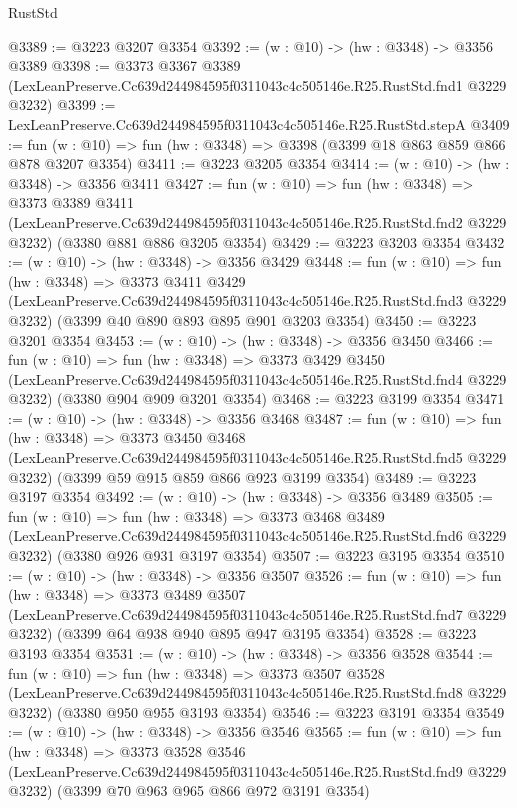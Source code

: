 \begin{lexlean}{RustStd}
\begin{coremodule}
@3389 := @3223 @3207 @3354
@3392 := (w : @10) -> (hw : @3348) -> @3356 @3389
@3398 := @3373
    @3367
    @3389
    (LexLeanPreserve.Cc639d244984595f0311043c4c505146e.R25.RustStd.fnd1 @3229 @3232)
@3399 := LexLeanPreserve.Cc639d244984595f0311043c4c505146e.R25.RustStd.stepA
@3409 := fun (w : @10) => fun (hw : @3348) => @3398 (@3399 @18 @863 @859 @866 @878 @3207 @3354)
@3411 := @3223 @3205 @3354
@3414 := (w : @10) -> (hw : @3348) -> @3356 @3411
@3427 := fun (w : @10) =>
  fun (hw : @3348) =>
  @3373
    @3389
    @3411
    (LexLeanPreserve.Cc639d244984595f0311043c4c505146e.R25.RustStd.fnd2 @3229 @3232)
    (@3380 @881 @886 @3205 @3354)
@3429 := @3223 @3203 @3354
@3432 := (w : @10) -> (hw : @3348) -> @3356 @3429
@3448 := fun (w : @10) =>
  fun (hw : @3348) =>
  @3373
    @3411
    @3429
    (LexLeanPreserve.Cc639d244984595f0311043c4c505146e.R25.RustStd.fnd3 @3229 @3232)
    (@3399 @40 @890 @893 @895 @901 @3203 @3354)
@3450 := @3223 @3201 @3354
@3453 := (w : @10) -> (hw : @3348) -> @3356 @3450
@3466 := fun (w : @10) =>
  fun (hw : @3348) =>
  @3373
    @3429
    @3450
    (LexLeanPreserve.Cc639d244984595f0311043c4c505146e.R25.RustStd.fnd4 @3229 @3232)
    (@3380 @904 @909 @3201 @3354)
@3468 := @3223 @3199 @3354
@3471 := (w : @10) -> (hw : @3348) -> @3356 @3468
@3487 := fun (w : @10) =>
  fun (hw : @3348) =>
  @3373
    @3450
    @3468
    (LexLeanPreserve.Cc639d244984595f0311043c4c505146e.R25.RustStd.fnd5 @3229 @3232)
    (@3399 @59 @915 @859 @866 @923 @3199 @3354)
@3489 := @3223 @3197 @3354
@3492 := (w : @10) -> (hw : @3348) -> @3356 @3489
@3505 := fun (w : @10) =>
  fun (hw : @3348) =>
  @3373
    @3468
    @3489
    (LexLeanPreserve.Cc639d244984595f0311043c4c505146e.R25.RustStd.fnd6 @3229 @3232)
    (@3380 @926 @931 @3197 @3354)
@3507 := @3223 @3195 @3354
@3510 := (w : @10) -> (hw : @3348) -> @3356 @3507
@3526 := fun (w : @10) =>
  fun (hw : @3348) =>
  @3373
    @3489
    @3507
    (LexLeanPreserve.Cc639d244984595f0311043c4c505146e.R25.RustStd.fnd7 @3229 @3232)
    (@3399 @64 @938 @940 @895 @947 @3195 @3354)
@3528 := @3223 @3193 @3354
@3531 := (w : @10) -> (hw : @3348) -> @3356 @3528
@3544 := fun (w : @10) =>
  fun (hw : @3348) =>
  @3373
    @3507
    @3528
    (LexLeanPreserve.Cc639d244984595f0311043c4c505146e.R25.RustStd.fnd8 @3229 @3232)
    (@3380 @950 @955 @3193 @3354)
@3546 := @3223 @3191 @3354
@3549 := (w : @10) -> (hw : @3348) -> @3356 @3546
@3565 := fun (w : @10) =>
  fun (hw : @3348) =>
  @3373
    @3528
    @3546
    (LexLeanPreserve.Cc639d244984595f0311043c4c505146e.R25.RustStd.fnd9 @3229 @3232)
    (@3399 @70 @963 @965 @866 @972 @3191 @3354)

\end{coremodule}
\end{lexlean}
